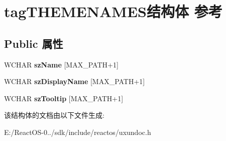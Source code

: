 \hypertarget{structtag_t_h_e_m_e_n_a_m_e_s}{}\section{tag\+T\+H\+E\+M\+E\+N\+A\+M\+E\+S结构体 参考}
\label{structtag_t_h_e_m_e_n_a_m_e_s}
\subsection*{Public 属性}
\begin{DoxyCompactItemize}
\item 
\mbox{\label{structtag_t_h_e_m_e_n_a_m_e_s_a100f0d19f9f371cc2b63327aaa258154}} 
W\+C\+H\+AR {\bfseries sz\+Name} \mbox{[}M\+A\+X\+\_\+\+P\+A\+TH+1\mbox{]}
\item 
\mbox{\label{structtag_t_h_e_m_e_n_a_m_e_s_a0cf5c39c79e4f3489fe50d560c149872}} 
W\+C\+H\+AR {\bfseries sz\+Display\+Name} \mbox{[}M\+A\+X\+\_\+\+P\+A\+TH+1\mbox{]}
\item 
\mbox{\label{structtag_t_h_e_m_e_n_a_m_e_s_af4bd000153071275b0666acc63f2d12f}} 
W\+C\+H\+AR {\bfseries sz\+Tooltip} \mbox{[}M\+A\+X\+\_\+\+P\+A\+TH+1\mbox{]}
\end{DoxyCompactItemize}


该结构体的文档由以下文件生成\+:\begin{DoxyCompactItemize}
\item 
E\+:/\+React\+O\+S-\/0../sdk/include/reactos/uxundoc.\+h\end{DoxyCompactItemize}
